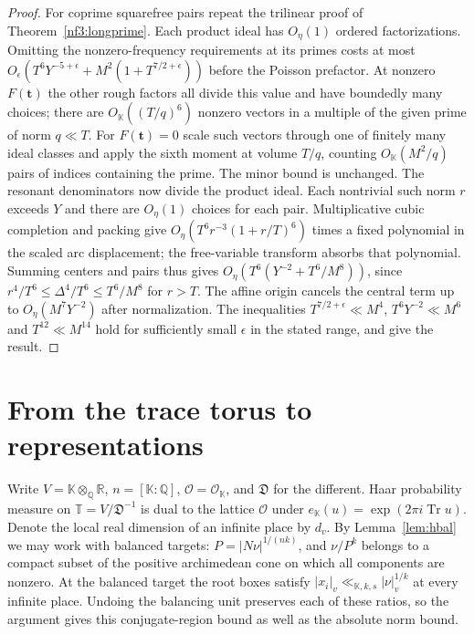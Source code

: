 \documentclass[11pt,letterpaper]{article}
\theoremstyle{definition}
\numberwithin{equation}{section}
\begin{document}
\begin{proof}
For coprime squarefree pairs repeat the trilinear proof of
Theorem~\ref{nf3:longprime}. Each product ideal has $O_\eta(1)$
ordered factorizations. Omitting the nonzero-frequency requirements
at its primes costs at most
$O_\epsilon(T^6Y^{-5+\epsilon}+M^2(1+T^{7/2+\epsilon}))$
before the Poisson prefactor. At nonzero $F(\mathbf t)$ the other
rough factors all divide this value and have boundedly many choices;
there are $O_{\mathbb K}((T/q)^6)$ nonzero vectors in a multiple
of the given prime of norm $q\ll T$. For $F(\mathbf t)=0$ scale
such vectors through one of finitely many ideal classes and apply
the sixth moment at volume $T/q$, counting $O_{\mathbb K}(M^2/q)$
pairs of indices containing the prime. The minor bound is unchanged.
The resonant denominators now divide the product ideal. Each
nontrivial such norm $r$ exceeds $Y$ and there are $O_\eta(1)$
choices for each pair. Multiplicative cubic completion and packing
give $O_\eta(T^6 r^{-3}(1+r/T)^6)$ times a fixed polynomial in the
scaled arc displacement; the free-variable transform absorbs that
polynomial. Summing centers and pairs thus gives
$O_\eta(T^6(Y^{-2}+T^6/M^8))$, since
$r^4/T^6\le\Delta^4/T^6\le T^6/M^8$ for $r>T$.
The affine origin cancels the central term up to
$O_\eta(M^7Y^{-2})$ after normalization. The inequalities
$T^{7/2+\epsilon}\ll M^4$, $T^6Y^{-2}\ll M^6$ and
$T^{12}\ll M^{14}$ hold for sufficiently small $\epsilon$ in the
stated range, and give the result.
\end{proof}

\section{From the trace torus to representations}
\label{sec:nf-global}
Write $V=\mathbb K\otimes_{\mathbb Q}\mathbb R$,
$n=[\mathbb K:\mathbb Q]$, $\mathcal O=\mathcal O_{\mathbb K}$,
and $\mathfrak D$ for the different. Haar probability measure on
$\mathbb T=V/\mathfrak D^{-1}$ is dual to the lattice $\mathcal O$
under $e_{\mathbb K}(u)=\exp(2\pi i\operatorname{Tr}u)$. Denote
the local real dimension of an infinite place by $d_v$. By
Lemma~\ref{lem:hbal} we may work with balanced targets:
$P=|N\nu|^{1/(nk)}$, and $\nu/P^k$ belongs to a compact subset of
the positive archimedean cone on which all components are nonzero.
At the balanced target the root boxes satisfy
$|x_i|_v\ll_{\mathbb K,k,s}|\nu|_v^{1/k}$ at every infinite place.
Undoing the balancing unit preserves each of these ratios, so the
argument gives this conjugate-region bound as well as the absolute
norm bound.
\end{document}
